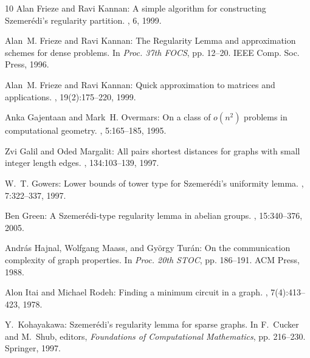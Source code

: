 \begin{thebibliography}{10}
{\sc Alan Frieze and Ravi Kannan}: A simple algorithm for constructing
  {S}zemer{\'e}di's regularity partition.
, 6, 1999.

{\sc Alan~M. Frieze and Ravi Kannan}: The {R}egularity {L}emma and
  approximation schemes for dense problems.
\newblock In {\em Proc. 37th FOCS}, pp. 12--20. IEEE Comp. Soc. Press, 1996.

{\sc Alan~M. Frieze and Ravi Kannan}: Quick approximation to matrices and
  applications.
, 19(2):175--220, 1999.
\newblock [\epfmtdoi{10.1007/s004930050052}]

{\sc Anka Gajentaan and Mark~H. Overmars}: On a class of $o(n^2)$ problems in
  computational geometry.
, 5:165--185, 1995.
\newblock [\epfmtdoi{10.1016/0925-7721(95)00022-2}]

{\sc Zvi Galil and Oded Margalit}: All pairs shortest distances for graphs with
  small integer length edges.
, 134:103--139, 1997.

{\sc W.~T. Gowers}: Lower bounds of tower type for {S}zemer\'{e}di's uniformity
  lemma.
, 7:322--337, 1997.
\newblock [\epfmtdoi{10.1007/PL00001621}]

{\sc Ben Green}: A {S}zemer{\'e}di-type regularity lemma in abelian groups.
, 15:340--376, 2005.
\newblock [\epfmtdoi{10.1007/s00039-005-0509-8}]

{\sc Andr{\'a}s Hajnal, Wolfgang Maass, and Gy{\"o}rgy Tur{\'a}n}: On the
  communication complexity of graph properties.
\newblock In {\em Proc. 20th STOC}, pp. 186--191. ACM Press, 1988.
\newblock [\epfmtdoi{10.1145/62212.62228}]

{\sc Alon Itai and Michael Rodeh}: Finding a minimum circuit in a graph.
, 7(4):413--423, 1978.
\newblock [\epfmtdoi{10.1137/0207033}]

{\sc Y.~Kohayakawa}: {Szemer\'{e}di's} regularity lemma for sparse graphs.
\newblock In {\sc F.~Cucker and M.~Shub}, editors, {\em Foundations of
  Computational Mathematics}, pp. 216--230. Springer, 1997.


\end{thebibliography}
